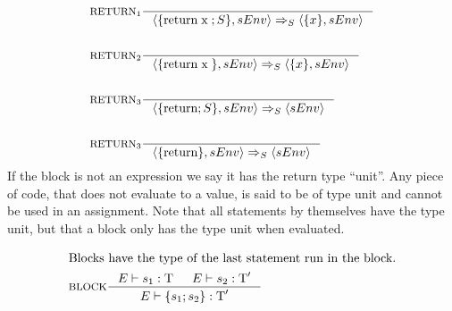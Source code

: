 \begin{align*}
&\inference[$\text{RETURN}_{1}$]{}
                   {\Braket{\{\Treturn \Tx;S\},sEnv} \Rightarrow_S \Braket{\{x\},sEnv}}
\\\\
&\inference[$\text{RETURN}_{2}$]{}
                   {\Braket{\{\Treturn \Tx\},sEnv} \Rightarrow_S \Braket{\{x\},sEnv}}
\\\\
&\inference[$\text{RETURN}_{3}$]{}
                   {\Braket{\{\Treturn;S\},sEnv} \Rightarrow_S \Braket{sEnv}}
\\\\
&\inference[$\text{RETURN}_{3}$]{}
                   {\Braket{\{\Treturn\},sEnv} \Rightarrow_S \Braket{sEnv}}
\end{align*}
If the block is not an expression we say it has the return type \enquote{unit}. Any piece of code, that does not evaluate to a value, is said to be of type unit and cannot be used in an assignment. Note that all statements by themselves have the type unit, but that a block only has the type unit when evaluated.

\begin{align*}
\intertext{Blocks have the type of the last statement run in the block.}
&\inference[BLOCK]{\Tenv s_1: \Tt & \Tenv s_2: \Tt'}
                 {\Tenv \{s_1; s_2\} : \Tt'}
\end{align*}
